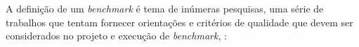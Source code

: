 


A definição de um \textit{benchmark} é tema de inúmeras pesquisas, uma série de trabalhos que tentam fornecer orientações e critérios de qualidade que devem ser considerados no projeto e execução de \textit{benchmark}, \cite{Kistowski2015, Chen2014, Folkerts2013, Marco2012, Huppler2009, Gray1992} :


